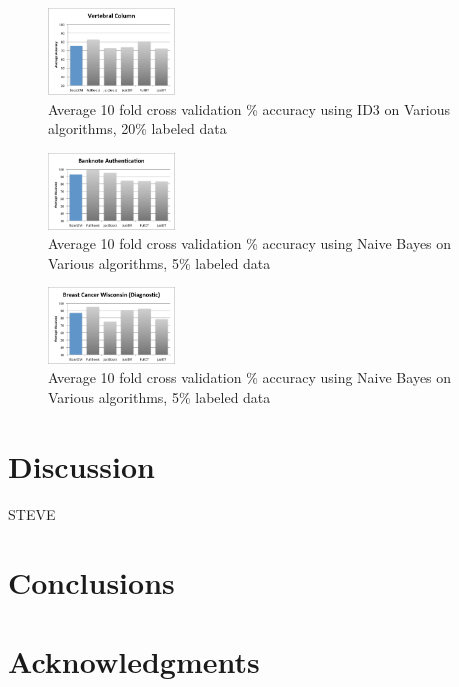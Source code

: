 \documentclass{sig-alternate}
\begin{document}
\begin{figure}
\centering
\includegraphics[width=0.3\textwidth]{figures/vertAcc.pdf}
\caption{Average 10 fold cross validation \% accuracy using ID3 on Various algorithms, 20\% labeled data}
\label{vertAcc}
\end{figure}

\begin{figure}
\centering
\includegraphics[width=0.3\textwidth]{figures/bankAcc5.pdf}
\caption{Average 10 fold cross validation \% accuracy using Naive Bayes on Various algorithms, 5\% labeled data}
\label{vertAcc}
\end{figure}

\begin{figure}
\centering
\includegraphics[width=0.3\textwidth]{figures/breaAcc5.pdf}
\caption{Average 10 fold cross validation \% accuracy using Naive Bayes on Various algorithms, 5\% labeled data}
\label{vertAcc}
\end{figure}

\section{Discussion}
STEVE 
\section{Conclusions}
\section{Acknowledgments}


\end{document}

